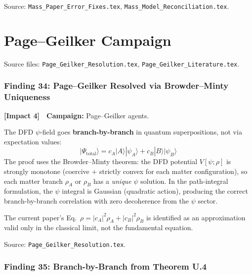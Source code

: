 \documentclass[11pt,a4paper]{article}
\newcommand{\impactfour}{\textcolor{impact4}{\textbf{[Impact 4]}}}
\begin{document}
Source: \texttt{Mass\_Paper\_Error\_Fixes.tex}, \texttt{Mass\_Model\_Reconciliation.tex}.


\part{Page--Geilker Campaign}
\label{part:page-geilker}

Source files: \texttt{Page\_Geilker\_Resolution.tex},
\texttt{Page\_Geilker\_Literature.tex}.


\section{Finding 34: Page--Geilker Resolved via Browder--Minty Uniqueness}
\label{sec:PG-browder}

\impactfour\ \ \textbf{Campaign:} Page--Geilker agents.

The DFD $\psi$-field goes \textbf{branch-by-branch} in quantum
superpositions, not via expectation values:
\[
|\Psi_{\mathrm{total}}\rangle = c_A |A\rangle|\psi_A\rangle
+ c_B |B\rangle|\psi_B\rangle
\]
The proof uses the Browder--Minty theorem: the DFD potential
$V[\psi;\rho]$ is strongly monotone (coercive + strictly convex for each
matter configuration), so each matter branch $\rho_A$ or $\rho_B$ has a
\emph{unique} $\psi$ solution. In the path-integral formulation, the
$\psi$ integral is Gaussian (quadratic action), producing the correct
branch-by-branch correlation with zero decoherence from the $\psi$ sector.

The current paper's Eq.~$\rho = |c_A|^2\rho_A + |c_B|^2\rho_B$ is
identified as an approximation valid only in the classical limit, not
the fundamental equation.

Source: \texttt{Page\_Geilker\_Resolution.tex}.


\section{Finding 35: Branch-by-Branch from Theorem U.4}
\label{sec:branch}
\end{document}
